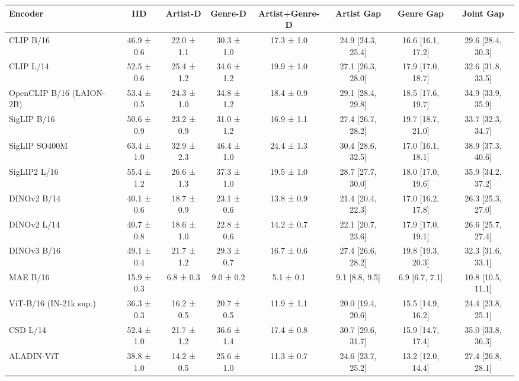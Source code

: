 \begin{tabular}{lccccccc}
\toprule
Encoder & IID & Artist-D & Genre-D & Artist+Genre-D & Artist Gap & Genre Gap & Joint Gap \\
\midrule
CLIP B/16 & 46.9 ± 0.6 & 22.0 ± 1.1 & 30.3 ± 1.0 & 17.3 ± 1.0 & 24.9 [24.3, 25.4] & 16.6 [16.1, 17.2] & 29.6 [28.4, 30.3] \\
CLIP L/14 & 52.5 ± 0.6 & 25.4 ± 1.2 & 34.6 ± 1.2 & 19.9 ± 1.0 & 27.1 [26.3, 28.0] & 17.9 [17.0, 18.7] & 32.6 [31.8, 33.5] \\
OpenCLIP B/16 (LAION-2B) & 53.4 ± 0.5 & 24.3 ± 1.0 & 34.8 ± 1.2 & 18.4 ± 0.9 & 29.1 [28.4, 29.8] & 18.5 [17.6, 19.7] & 34.9 [33.9, 35.9] \\
SigLIP B/16 & 50.6 ± 0.9 & 23.2 ± 0.9 & 31.0 ± 1.2 & 16.9 ± 1.1 & 27.4 [26.7, 28.2] & 19.7 [18.7, 21.0] & 33.7 [32.3, 34.7] \\
SigLIP SO400M & 63.4 ± 1.0 & 32.9 ± 2.3 & 46.4 ± 1.0 & 24.4 ± 1.3 & 30.4 [28.6, 32.5] & 17.0 [16.1, 18.1] & 38.9 [37.3, 40.6] \\
SigLIP2 L/16 & 55.4 ± 1.2 & 26.6 ± 1.3 & 37.3 ± 1.0 & 19.5 ± 1.0 & 28.7 [27.7, 30.0] & 18.0 [17.0, 19.6] & 35.9 [34.2, 37.2] \\
DINOv2 B/14 & 40.1 ± 0.6 & 18.7 ± 0.9 & 23.1 ± 0.6 & 13.8 ± 0.9 & 21.4 [20.4, 22.3] & 17.0 [16.2, 17.8] & 26.3 [25.3, 27.0] \\
DINOv2 L/14 & 40.7 ± 0.8 & 18.6 ± 1.0 & 22.8 ± 0.6 & 14.2 ± 0.7 & 22.1 [20.7, 23.6] & 17.9 [17.0, 19.1] & 26.6 [25.7, 27.4] \\
DINOv3 B/16 & 49.1 ± 0.4 & 21.7 ± 1.2 & 29.3 ± 0.7 & 16.7 ± 0.6 & 27.4 [26.6, 28.2] & 19.8 [19.3, 20.3] & 32.3 [31.6, 33.1] \\
MAE B/16 & 15.9 ± 0.3 & 6.8 ± 0.3 & 9.0 ± 0.2 & 5.1 ± 0.1 & 9.1 [8.8, 9.5] & 6.9 [6.7, 7.1] & 10.8 [10.5, 11.1] \\
ViT-B/16 (IN-21k sup.) & 36.3 ± 0.3 & 16.2 ± 0.5 & 20.7 ± 0.5 & 11.9 ± 1.1 & 20.0 [19.4, 20.6] & 15.5 [14.9, 16.2] & 24.4 [23.8, 25.1] \\
CSD L/14 & 52.4 ± 1.0 & 21.7 ± 1.2 & 36.6 ± 1.4 & 17.4 ± 0.8 & 30.7 [29.6, 31.7] & 15.9 [14.7, 17.4] & 35.0 [33.8, 36.3] \\
ALADIN-ViT & 38.8 ± 1.0 & 14.2 ± 0.5 & 25.6 ± 1.0 & 11.3 ± 0.7 & 24.6 [23.7, 25.2] & 13.2 [12.0, 14.4] & 27.4 [26.8, 28.1] \\
\bottomrule
\end{tabular}
